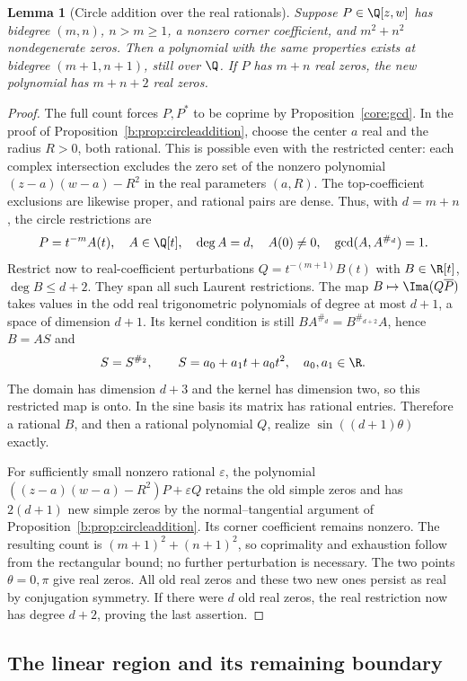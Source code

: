 \documentclass[UTF8,11pt]{ctexart}
\newtheorem{lem}[thm]{Lemma}
\theoremstyle{definition}
\numberwithin{equation}{section}
\newcommand{\eps}{\varepsilon}\newcommand{\ep}{\varepsilon}
\begin{document}
\begin{lem}[Circle addition over the real rationals]\label{v5:lem:realcircle}
Suppose $P\in\Q[z,w]$ has bidegree $(m,n)$, $n>m\ge1$,
a nonzero corner coefficient, and $m^2+n^2$ nondegenerate zeros.
Then a polynomial with the same properties exists at bidegree
$(m+1,n+1)$, still over $\Q$. If $P$ has $m+n$ real zeros,
the new polynomial has $m+n+2$ real zeros.
\end{lem}
\begin{proof}
The full count forces $P,P^*$ to be coprime by
Proposition~\ref{core:gcd}. In the proof of
Proposition~\ref{b:prop:circleaddition}, choose the center $a$
real and the radius $R>0$, both rational. This is possible even
with the restricted center: each complex intersection excludes
the zero set of the nonzero polynomial
$(z-a)(w-a)-R^2$ in the real parameters $(a,R)$.
The top-coefficient exclusions are likewise proper, and rational
pairs are dense. Thus, with $d=m+n$, the circle restrictions are
\[
 P=t^{-m}A(t),\quad A\in\Q[t],\quad\deg A=d,\quad A(0)\ne0,
 \quad \gcd(A,A^{\#_d})=1.
\]
Restrict now to real-coefficient perturbations
$Q=t^{-(m+1)}B(t)$ with $B\in\R[t]$, $\deg B\le d+2$.
They span all such Laurent restrictions. The map
$B\mapsto\Ima(Q\overline P)$ takes values in the odd real
trigonometric polynomials of degree at most $d+1$, a space
of dimension $d+1$. Its kernel condition is still
$BA^{\#_d}=B^{\#_{d+2}}A$, hence $B=AS$ and
\[
 S=S^{\#_2},\qquad S=a_0+a_1t+a_0t^2,\quad a_0,a_1\in\R.
\]
The domain has dimension $d+3$ and the kernel has dimension two,
so this restricted map is onto. In the sine basis its matrix has
rational entries. Therefore a rational $B$, and then a rational
polynomial $Q$, realize $\sin((d+1)\theta)$ exactly.

For sufficiently small nonzero rational $\eps$, the polynomial
$((z-a)(w-a)-R^2)P+\eps Q$ retains the old simple zeros and
has $2(d+1)$ new simple zeros by the normal--tangential argument
of Proposition~\ref{b:prop:circleaddition}. Its corner coefficient
remains nonzero. The resulting count is
$(m+1)^2+(n+1)^2$, so coprimality and exhaustion follow from
the rectangular bound; no further perturbation is necessary.
The two points $\theta=0,\pi$ give real zeros. All old real zeros
and these two new ones persist as real by conjugation symmetry.
If there were $d$ old real zeros, the real restriction now has
degree $d+2$, proving the last assertion.
\end{proof}


\subsection{The linear region and its remaining boundary}
\end{document}
